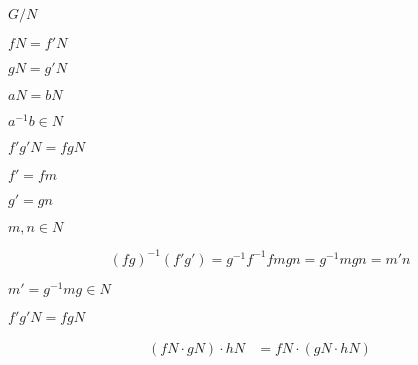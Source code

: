 \documentclass[10pt]{book}
\begin{document}
\begin{mdSnippets}
\begin{mdInlineSnippet}[aa264a8ce114f1e86dda79b1f6205717]
$G/N$\end{mdInlineSnippet}%
\begin{mdInlineSnippet}[eabbf1d6a7735b6885b6815491c61c55]%
$fN = f'N$\end{mdInlineSnippet}%
\begin{mdInlineSnippet}[689af3f5d86456a9fcd70357e5ea1167]%
$gN = g'N$\end{mdInlineSnippet}%
\begin{mdInlineSnippet}[a9c0445d2196f015a192d2779b368d18]%
$aN = bN$\end{mdInlineSnippet}%
\begin{mdInlineSnippet}[c1f096b283e3d932c7dcb1d489729725]%
$a^{-1}b \in N$\end{mdInlineSnippet}%
\begin{mdInlineSnippet}[53c912aa99a353c7001f2dfeaa77bb58]%
$f'g'N = fgN$\end{mdInlineSnippet}%
\begin{mdInlineSnippet}[2356cff6714f6398849c6475b1f423fd]%
$f' = fm$\end{mdInlineSnippet}%
\begin{mdInlineSnippet}%
$g' = gn$\end{mdInlineSnippet}%
\begin{mdInlineSnippet}%
$m,n \in N$\end{mdInlineSnippet}%
\begin{mdDisplaySnippet}[df184c0dfffcf7730c625743090fd6f2]%
\[%
(fg)^{-1}(f'g') = g^{-1} f^{-1} fm gn = g^{-1} mgn = m'n
\]%
\end{mdDisplaySnippet}%
\begin{mdInlineSnippet}%
$m' = g^{-1} mg \in N$\end{mdInlineSnippet}%
\begin{mdInlineSnippet}[53c912aa99a353c7001f2dfeaa77bb58]%
$f'g'N = fgN$\end{mdInlineSnippet}%
\begin{mdDisplaySnippet}[58f6a4f86da11c36e07a104159f392b9]%
\[%
\begin{aligned}
(fN \cdot gN) \cdot hN &= fN \cdot (gN \cdot hN) \\

\end{aligned}\]
\end{mdDisplaySnippet}
\end{mdSnippets}
\end{document}
